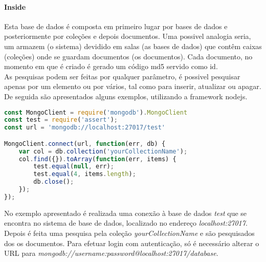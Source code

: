 \paragraph{Inside}
Esta base de dados é composta em primeiro lugar por bases de dados e posteriormente por coleções e depois documentos. Uma possivel analogia seria, um armazem (o sistema) devidido em salas (as bases de dados) que contêm caixas (coleções) onde se guardam documentos (os documentos). Cada documento, no momento em que é criado é gerado um código md5 servido como id.\newline \\
As pesquisas podem ser feitas por qualquer parâmetro, é possivel pesquisar apenas por um elemento ou por vários, tal como para inserir, atualizar ou apagar.\newline
De seguida são apresentados alguns exemplos, utilizando a framework nodejs.
\begin{lstlisting}[language=JavaScript]
const MongoClient = require('mongodb').MongoClient
const test = require('assert');
const url = 'mongodb://localhost:27017/test'

MongoClient.connect(url, function(err, db) {
    var col = db.collection('yourCollectionName');
    col.find({}).toArray(function(err, items) {
        test.equal(null, err);
        test.equal(4, items.length);
        db.close();
    });
});
\end{lstlisting}
No exemplo apresentado é realizada uma conexão à base de dados \textit{test} que se encontra no sistema de base de dados, localizado no endereço \textit{localhost:27017}.\newline
Depois é feita uma pesquisa pela coleção \textit{yourCollectionName} e são pesquisados dos os documentos.
Para efetuar login com autenticação, só é necessário alterar o URL para \textit{mongodb://username:password@localhost:27017/database}.
